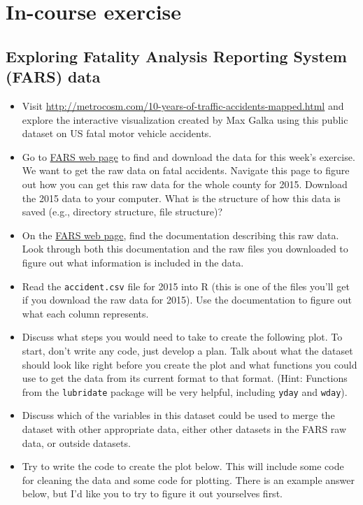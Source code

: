 \documentclass[]{book}
\providecommand{\tightlist}{%
  \setlength{\itemsep}{0pt}\setlength{\parskip}{0pt}}
\theoremstyle{definition}
\theoremstyle{definition}
\theoremstyle{definition}
\theoremstyle{remark}
\begin{document}
\section{In-course exercise}\label{in-course-exercise-6}

\subsection{Exploring Fatality Analysis Reporting System (FARS)
data}\label{exploring-fatality-analysis-reporting-system-fars-data-1}

\begin{itemize}
\tightlist
\item
  Visit
  \url{http://metrocosm.com/10-years-of-traffic-accidents-mapped.html}
  and explore the interactive visualization created by Max Galka using
  this public dataset on US fatal motor vehicle accidents.
\item
  Go to
  \href{http://www.nhtsa.gov/Data/Fatality-Analysis-Reporting-System-(FARS)}{FARS
  web page} to find and download the data for this week's exercise. We
  want to get the raw data on fatal accidents. Navigate this page to
  figure out how you can get this raw data for the whole county for
  2015. Download the 2015 data to your computer. What is the structure
  of how this data is saved (e.g., directory structure, file structure)?
\item
  On the
  \href{http://www.nhtsa.gov/Data/Fatality-Analysis-Reporting-System-(FARS)}{FARS
  web page}, find the documentation describing this raw data. Look
  through both this documentation and the raw files you downloaded to
  figure out what information is included in the data.
\item
  Read the \texttt{accident.csv} file for 2015 into R (this is one of
  the files you'll get if you download the raw data for 2015). Use the
  documentation to figure out what each column represents.
\item
  Discuss what steps you would need to take to create the following
  plot. To start, don't write any code, just develop a plan. Talk about
  what the dataset should look like right before you create the plot and
  what functions you could use to get the data from its current format
  to that format. (Hint: Functions from the \texttt{lubridate} package
  will be very helpful, including \texttt{yday} and \texttt{wday}).
\item
  Discuss which of the variables in this dataset could be used to merge
  the dataset with other appropriate data, either other datasets in the
  FARS raw data, or outside datasets.
\item
  Try to write the code to create the plot below. This will include some
  code for cleaning the data and some code for plotting. There is an
  example answer below, but I'd like you to try to figure it out
  yourselves first.
\end{itemize}
\end{document}

